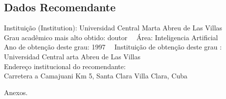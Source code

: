 \documentclass[11pt]{article}
\begin{document}
\subsection*{Dados Recomendante} 
	Instituição (Institution): Universidad Central Marta Abreu de Las Villas
\\ 
	Grau acadêmico mais alto obtido: doutor
	\ \ Área: Inteligencia Artificial
	\\
	Ano de obtenção deste grau: 1997
	\ \ 
	Instituição de obtenção deste grau : Universidad Central arta Abreu de Las Villas
	\\ 
	Endereço institucional do recomendante: \\ Carretera a Camajuani Km 5, Santa Clara Villa Clara, Cuba 
\begin{center}
Anexos.
\end{center}
\end{document}

